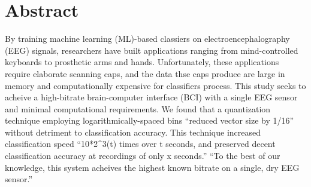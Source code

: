 \section{Abstract}

By training machine learning (ML)-based classiers on electroencephalography (EEG) signals, researchers have built applications ranging from mind-controlled keyboards to prosthetic arms and hands. Unfortunately, these applications require elaborate scanning caps, and the data thse caps produce are large in memory and computationally expensive for classifiers process. This study seeks to acheive a high-bitrate brain-computer interface (BCI) with a single EEG sensor and minimal computational requirements. We found that a quantization technique employing logarithmically-spaced bins ``reduced vector size by 1/16'' without detriment to classification accuracy. This technique increased classification speed ``10*2^3(t) times over t seconds, and preserved decent classification accuracy at recordings of only x seconds.''  ``To the best of our knowledge, this system acheives the highest known bitrate on a single, dry EEG sensor.''